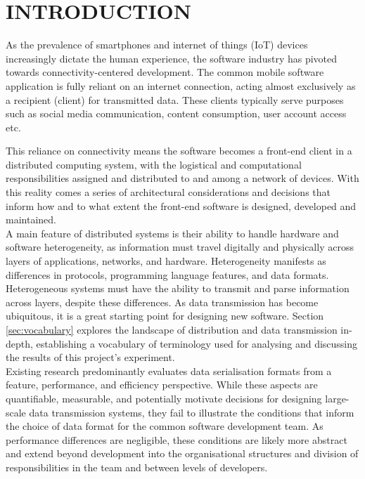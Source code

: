 \documentclass[../report.tex]{subfiles}
\begin{document}
\section{INTRODUCTION}

As the prevalence of smartphones and internet of things (IoT) devices increasingly dictate the human experience, the software industry has pivoted towards connectivity-centered development. The common mobile software application is fully reliant on an internet connection, acting almost exclusively as a recipient (client) for transmitted data. These clients typically serve purposes such as social media communication, content consumption, user account access etc.

This reliance on connectivity means the software becomes a front-end client in a distributed computing system, with the logistical and computational responsibilities assigned and distributed to and among a network of devices. With this reality comes a series of architectural considerations and decisions that inform how and to what extent the front-end software is designed, developed and maintained. \\

A main feature of distributed systems is their ability to handle hardware and software heterogeneity, as information must travel digitally and physically across layers of applications, networks, and hardware. Heterogeneity manifests as differences in protocols, programming language features, and data formats. Heterogeneous systems must have the ability to transmit and parse information across layers, despite these differences. As data transmission has become ubiquitous, it is a great starting point for designing new software. Section \ref{sec:vocabulary} explores the landscape of distribution and data transmission in-depth, establishing a vocabulary of terminology used for analysing and discussing the results of this project's experiment. \\

Existing research predominantly evaluates data serialisation formats from a feature, performance, and efficiency perspective. While these aspects are quantifiable, measurable, and potentially motivate decisions for designing large-scale data transmission systems, they fail to illustrate the conditions that inform the choice of data format for the common software development team. As performance differences are negligible, these conditions are likely more abstract and extend beyond development into the organisational structures and division of responsibilities in the team and between levels of developers. \\
\end{document}
